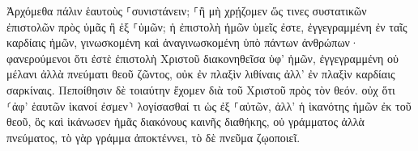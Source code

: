 \documentclass{openreader}
\begin{document}
Ἀρχόμεθα πάλιν ἑαυτοὺς ⸀συνιστάνειν; ⸀ἢ μὴ χρῄζομεν ὥς τινες συστατικῶν ἐπιστολῶν πρὸς ὑμᾶς ἢ ἐξ ⸀ὑμῶν; 
ἡ ἐπιστολὴ ἡμῶν ὑμεῖς ἐστε, ἐγγεγραμμένη ἐν ταῖς καρδίαις ἡμῶν, γινωσκομένη καὶ ἀναγινωσκομένη ὑπὸ πάντων ἀνθρώπων· 
φανερούμενοι ὅτι ἐστὲ ἐπιστολὴ Χριστοῦ διακονηθεῖσα ὑφ’ ἡμῶν, ἐγγεγραμμένη οὐ μέλανι ἀλλὰ πνεύματι θεοῦ ζῶντος, οὐκ ἐν πλαξὶν λιθίναις ἀλλ’ ἐν πλαξὶν καρδίαις σαρκίναις. 
Πεποίθησιν δὲ τοιαύτην ἔχομεν διὰ τοῦ Χριστοῦ πρὸς τὸν θεόν. 
οὐχ ὅτι ⸂ἀφ’ ἑαυτῶν ἱκανοί ἐσμεν⸃ λογίσασθαί τι ὡς ἐξ ⸀αὑτῶν, ἀλλ’ ἡ ἱκανότης ἡμῶν ἐκ τοῦ θεοῦ, 
ὃς καὶ ἱκάνωσεν ἡμᾶς διακόνους καινῆς διαθήκης, οὐ γράμματος ἀλλὰ πνεύματος, τὸ γὰρ γράμμα ἀποκτέννει, τὸ δὲ πνεῦμα ζῳοποιεῖ. 
\end{document}
